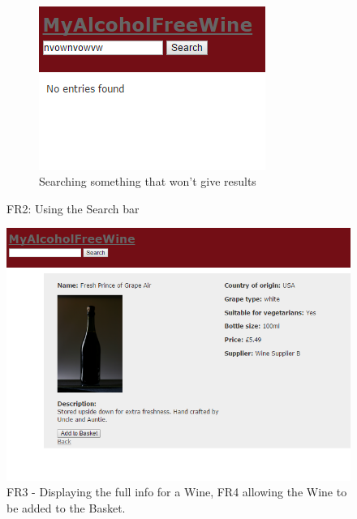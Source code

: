 \documentclass[12pt]{article}
\begin{document}
\begin{figure}[H]
    ~ %
    \begin{subfigure}[b]{0.3\textwidth}
        \includegraphics[width=\textwidth]{assets/FR2_screen_3}
        \caption{Searching something that won't give results}
        \label{fig:FR2 nonsense}
    \end{subfigure}
    \caption{FR2: Using the Search bar}\label{fig:FR2 Search}
\end{figure}

\begin{figure}[H]
        \centering
                \includegraphics[width=1\textwidth]{assets/FR3_screen}
                \caption{FR3 - Displaying the full info for a Wine, FR4 allowing the Wine to be added to the Basket.}
                \label{fig: FR3_1.} 
\end{figure}
\end{document}
